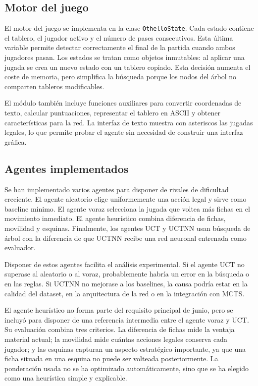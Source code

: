 \documentclass[conference,a4paper]{IEEEtran}
\begin{document}
\subsection{Motor del juego}

El motor del juego se implementa en la clase \texttt{OthelloState}. Cada estado
contiene el tablero, el jugador activo y el número de pases consecutivos. Esta
última variable permite detectar correctamente el final de la partida cuando
ambos jugadores pasan. Los estados se tratan como objetos inmutables: al aplicar
una jugada se crea un nuevo estado con un tablero copiado. Esta decisión aumenta
el coste de memoria, pero simplifica la búsqueda porque los nodos del árbol no
comparten tableros modificables.

El módulo también incluye funciones auxiliares para convertir coordenadas de
texto, calcular puntuaciones, representar el tablero en ASCII y obtener
características para la red. La interfaz de texto muestra con asteriscos las
jugadas legales, lo que permite probar el agente sin necesidad de construir una
interfaz gráfica.

\subsection{Agentes implementados}

Se han implementado varios agentes para disponer de rivales de dificultad
creciente. El agente aleatorio elige uniformemente una acción legal y sirve como
baseline mínimo. El agente voraz selecciona la jugada que voltea más fichas en
el movimiento inmediato. El agente heurístico combina diferencia de fichas,
movilidad y esquinas. Finalmente, los agentes UCT y UCTNN usan búsqueda de árbol
con la diferencia de que UCTNN recibe una red neuronal entrenada como evaluador.

Disponer de estos agentes facilita el análisis experimental. Si el agente UCT no
superase al aleatorio o al voraz, probablemente habría un error en la búsqueda o
en las reglas. Si UCTNN no mejorase a los baselines, la causa podría estar en la
calidad del dataset, en la arquitectura de la red o en la integración con MCTS.

El agente heurístico no forma parte del requisito principal de junio, pero se
incluyó para disponer de una referencia intermedia entre el agente voraz y UCT.
Su evaluación combina tres criterios. La diferencia de fichas mide la ventaja
material actual; la movilidad mide cuántas acciones legales conserva cada
jugador; y las esquinas capturan un aspecto estratégico importante, ya que una
ficha situada en una esquina no puede ser volteada posteriormente. La ponderación
usada no se ha optimizado automáticamente, sino que se ha elegido como una
heurística simple y explicable.
\end{document}
